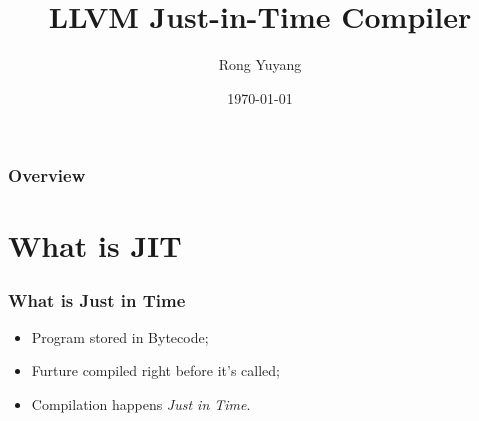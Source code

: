 \documentclass{beamer}
\title[LLVM JIT]{LLVM Just-in-Time Compiler} %
\author{Rong Yuyang} %
\institute[SIST] %
{
ShanghaiTech University \\ %
School of Information Science and Technology(SIST) \\
\medskip
\textit{rongyy@shanghaitech.edu.cn} %
}
\date{\today} %
\begin{document}
\begin{frame}
\titlepage %
\end{frame}

\begin{frame}
\frametitle{Overview} %
\tableofcontents %
\end{frame}


\section{What is JIT} %


\begin{frame}
\frametitle{What is Just in Time}
\begin{itemize}
	\item Program stored in Bytecode;
	\item Furture compiled right before it's called;
	\item Compilation happens \textit{Just in Time}.
\end{itemize}
\end{frame}
\end{document}
